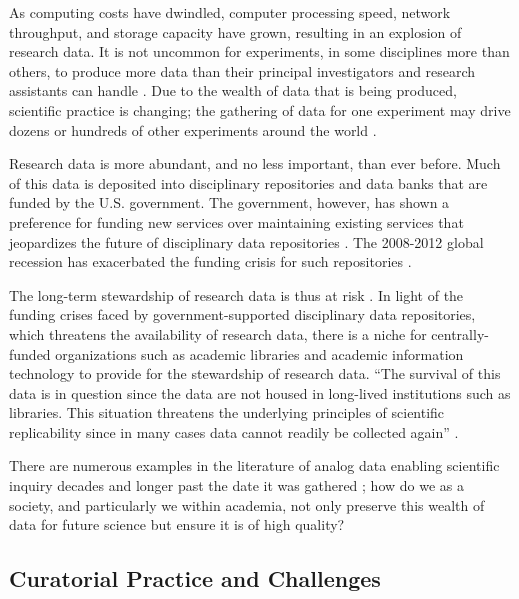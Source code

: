 \documentclass[man,12pt,biblatex]{apa6}
\begin{document}
As computing costs have dwindled, computer processing speed, network
throughput, and storage capacity have grown, resulting in an explosion
of research data.  It is not uncommon for experiments, in some
disciplines more than others, to produce more data than their
principal investigators and research assistants can
handle \parencite{adams:galaxyzoo}. Due to the wealth of data that is
being produced, scientific practice is changing; the gathering of data
for one experiment may drive dozens or hundreds of other experiments
around the world \parencite{jisc:deluge}.

Research data is more abundant, and no less important, than ever
before. Much of this data is deposited into disciplinary repositories
and data banks that are funded by the
U.S. government\parencite{merali:peril,baker:funding}. The government,
however, has shown a preference for funding new services over
maintaining existing services that jeopardizes the future of
disciplinary data repositories \parencite{merali:peril}. The 2008-2012
global recession has exacerbated the funding crisis for such
repositories \parencite{baker:funding}.

The long-term stewardship of research data is thus at
risk \parencite{ogburn:imperative}.  In light of the funding crises
faced by government-supported disciplinary data repositories, which
threatens the availability of research data, there is a niche for
centrally-funded organizations such as academic libraries and academic
information technology to provide for the stewardship of research
data. ``The survival of this data is in question since the data are
not housed in long-lived institutions such as libraries. This
situation threatens the underlying principles of scientific
replicability since in many cases data cannot readily be collected
again''
\parencite{heidorn:libraries}.

There are numerous examples in the literature of analog data enabling
scientific inquiry decades and longer past the date it was gathered
; how do we as a society, and particularly we within
academia, not only preserve this wealth of data for future science but
ensure it is of high quality?

\subsection{Curatorial Practice and Challenges}
\end{document}
